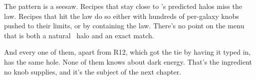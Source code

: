The pattern is a seesaw. Recipes that stay close to \LCDM's predicted halos miss the law. Recipes that hit the law do so either with hundreds of per-galaxy knobs pushed to their limits, or by containing the law. There's no point on the menu that is both a natural \LCDM\ halo and an exact match.

And every one of them, apart from R12, which got the tie by having it typed in, has the same hole. None of them knows about dark energy. That's the ingredient no knob supplies, and it's the subject of the next chapter.
